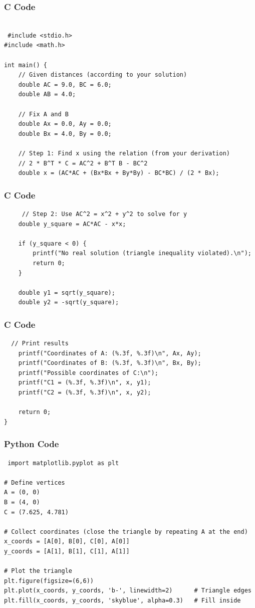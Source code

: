 \documentclass{beamer}
\begin{document}
\begin{frame}[fragile]
    \frametitle{C Code }

    \begin{lstlisting}

 #include <stdio.h>
#include <math.h>

int main() {
    // Given distances (according to your solution)
    double AC = 9.0, BC = 6.0;
    double AB = 4.0;

    // Fix A and B
    double Ax = 0.0, Ay = 0.0;
    double Bx = 4.0, By = 0.0;

    // Step 1: Find x using the relation (from your derivation)
    // 2 * B^T * C = AC^2 + B^T B - BC^2
    double x = (AC*AC + (Bx*Bx + By*By) - BC*BC) / (2 * Bx);

 \end{lstlisting}
\end{frame}

\begin{frame}[fragile]
    \frametitle{C Code}
    \begin{lstlisting}
     // Step 2: Use AC^2 = x^2 + y^2 to solve for y
    double y_square = AC*AC - x*x;

    if (y_square < 0) {
        printf("No real solution (triangle inequality violated).\n");
        return 0;
    }

    double y1 = sqrt(y_square);
    double y2 = -sqrt(y_square);

    \end{lstlisting}
\end{frame}

\begin{frame}[fragile]
    \frametitle{C Code}
    \begin{lstlisting}
  // Print results
    printf("Coordinates of A: (%.3f, %.3f)\n", Ax, Ay);
    printf("Coordinates of B: (%.3f, %.3f)\n", Bx, By);
    printf("Possible coordinates of C:\n");
    printf("C1 = (%.3f, %.3f)\n", x, y1);
    printf("C2 = (%.3f, %.3f)\n", x, y2);

    return 0;
}
    \end{lstlisting}
\end{frame}

\begin{frame}[fragile]
    \frametitle{Python Code}
    \begin{lstlisting}
 import matplotlib.pyplot as plt

# Define vertices
A = (0, 0)
B = (4, 0)
C = (7.625, 4.781)

# Collect coordinates (close the triangle by repeating A at the end)
x_coords = [A[0], B[0], C[0], A[0]]
y_coords = [A[1], B[1], C[1], A[1]]

# Plot the triangle
plt.figure(figsize=(6,6))
plt.plot(x_coords, y_coords, 'b-', linewidth=2)      # Triangle edges
plt.fill(x_coords, y_coords, 'skyblue', alpha=0.3)   # Fill inside


    \end{lstlisting}
\end{frame}
\end{document}
